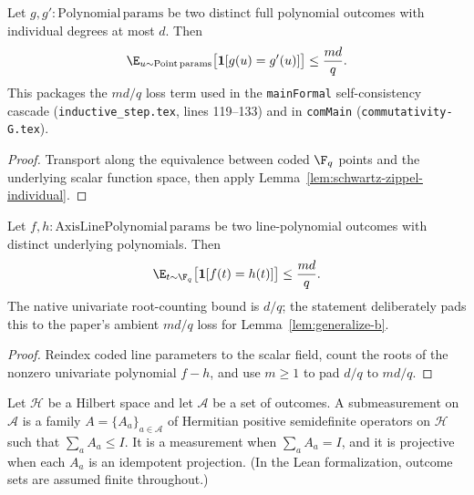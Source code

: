 \begin{lemma}\label{lem:polynomial-agreement-mdq}
	\leanok
	Let $g, g' : \mathrm{Polynomial}\,\mathrm{params}$ be two distinct full polynomial outcomes with individual degrees at most $d$. Then
	\[
		\E_{u \sim \mathrm{Point}\,\mathrm{params}}\bigl[\mathbf{1}[g(u) = g'(u)]\bigr] \le \frac{md}{q}.
	\]
	This packages the $md/q$ loss term used in the \texttt{mainFormal} self-consistency cascade (\texttt{inductive\_step.tex}, lines 119--133) and in \texttt{comMain} (\texttt{commutativity-G.tex}).
\end{lemma}
\begin{proof}
	\leanok
	Transport along the equivalence between coded $\F_q$ points and the underlying scalar function space, then apply Lemma~\ref{lem:schwartz-zippel-individual}.
\end{proof}

\begin{lemma}\label{lem:axis-line-polynomial-agreement-mdq}
	\leanok
	Let $f,h : \mathrm{AxisLinePolynomial}\,\mathrm{params}$ be two line-polynomial outcomes with distinct underlying polynomials. Then
	\[
		\E_{t \sim \F_q}\bigl[\mathbf{1}[f(t)=h(t)]\bigr] \le \frac{md}{q}.
	\]
	The native univariate root-counting bound is $d/q$; the statement deliberately pads this to the paper's ambient $md/q$ loss for Lemma~\ref{lem:generalize-b}.
\end{lemma}
\begin{proof}
	\leanok
	Reindex coded line parameters to the scalar field, count the roots of the nonzero univariate polynomial $f-h$, and use $m\ge 1$ to pad $d/q$ to $md/q$.
\end{proof}

\begin{definition}\label{def:submeasurement}
	\leanok
	Let $\mathcal H$ be a Hilbert space and let $\mathcal A$ be a set of outcomes. A submeasurement on $\mathcal A$ is a family $A=\{A_a\}_{a \in \mathcal A}$ of Hermitian positive semidefinite operators on $\mathcal H$ such that $\sum_a A_a \le I$. It is a measurement when $\sum_a A_a = I$, and it is projective when each $A_a$ is an idempotent projection. (In the Lean formalization, outcome sets are assumed finite throughout.)
\end{definition}

